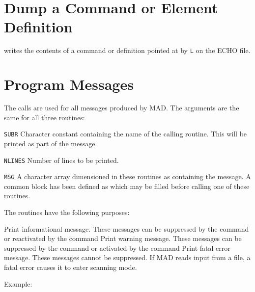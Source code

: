 \section{Dump a Command or Element Definition}
\label{AADUMP}
writes the contents of a command or definition pointed at by {\tt L}
on the ECHO file.
\clearpage

\section{Program Messages}
\label{AAFAIL}
\label{AAINFO}
\label{AAWARN}
The calls
are used for all messages produced by MAD.
The arguments are the same for all three routines:
\begin{mylist}
\item[\tt SUBR]
Character constant containing the name of the calling routine.
This will be printed as part of the message.
\item[\tt NLINES]
Number of lines to be printed.
\item[\tt MSG]
A character array dimensioned in these routines as
containing the message.
A common block has been defined as
which may be filled before calling one of these routines.
\end{mylist}
The routines have the following purposes:
\begin{mylist}
Print informational message.
These messages can be suppressed by the command
or reactivated by the command
Print warning message.
These messages can be suppressed by the command
or activated by the command
Print fatal error message.
These messages cannot be suppressed.
If MAD reads input from a file,
a fatal error causes it to enter scanning mode.
\end{mylist}
Example:
